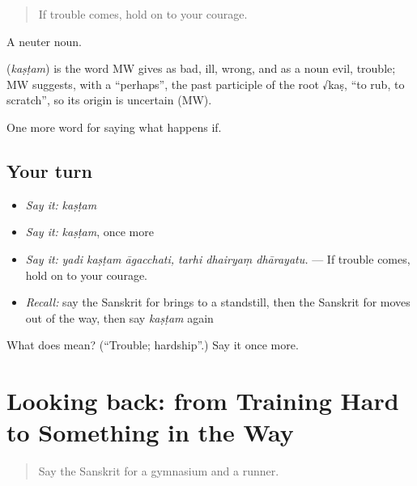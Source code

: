 \begin{quote}
If trouble comes, hold on to your courage.
\end{quote}

A neuter noun.

\begin{cousinweb}
\textbf{} (\emph{kaṣṭam}) is the word MW gives as bad, ill, wrong, and as a noun evil, trouble; MW suggests, with a \textquotedblleft{}perhaps\textquotedblright{}, the past participle of the root √kaṣ, \textquotedblleft{}to rub, to scratch\textquotedblright{}, so its origin is uncertain (MW).
\end{cousinweb}

\begin{grammarlens}[title={What you've built}]
One more word for saying what happens if.
\end{grammarlens}

\subsection*{Your turn}
\begin{itemize}
\raggedright
  \item \emph{Say it:} \emph{kaṣṭam}
  \item \emph{Say it:} \emph{kaṣṭam}, once more
  \item \emph{Say it:} \emph{yadi kaṣṭam āgacchati, tarhi dhairyaṃ dhārayatu.} — If trouble comes, hold on to your courage.
  \item \emph{Recall:} say the Sanskrit for brings to a standstill, then the Sanskrit for moves out of the way, then say \emph{kaṣṭam} again
\end{itemize}

\begin{tcolorbox}[breakable,colback=teal!4,colframe=teal!35!black,title={Before you move on}]
What does  mean? (\textquotedblleft{}Trouble; hardship\textquotedblright{}.) Say it once more.
\end{tcolorbox}
\section[(dialogue)]{Looking back: from Training Hard to Something in the Way}

\label{lesson:SA-R533-review-526-533}



\begin{quote}
Say the Sanskrit for a gymnasium and a runner.
\end{quote}

